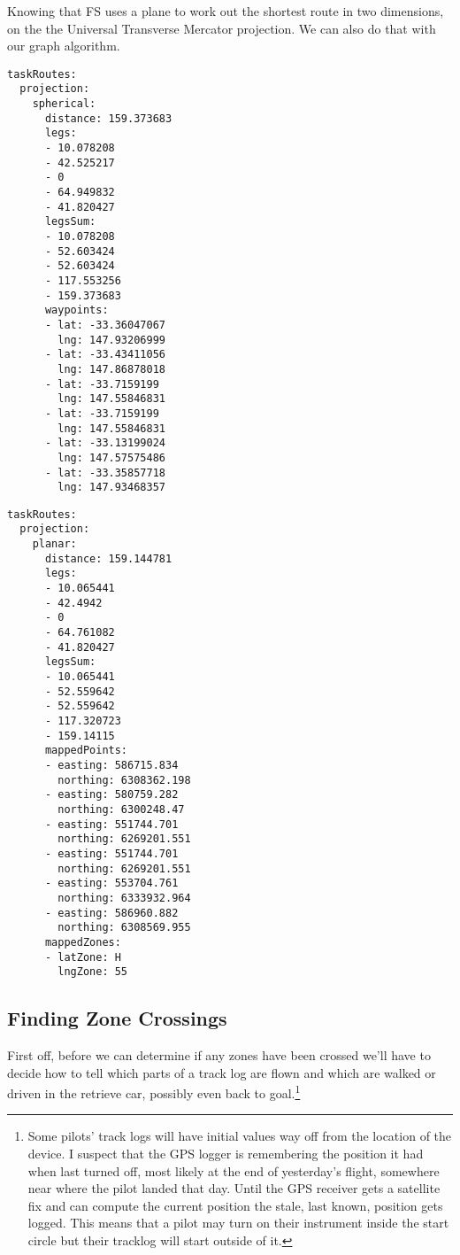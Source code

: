 \documentclass[gap.tex]{subfiles}
\begin{document}
\newpage
Knowing that FS uses a plane to work out the shortest route in two dimensions,
on the the Universal Transverse Mercator projection.  We can also do that with
our graph algorithm.

\begin{lstlisting}[caption={Points on the plane, distances on the sphere, \texttt{projection/spherical} nodes of
\texttt{*.task-length.yaml}.}]
taskRoutes:
  projection:
    spherical:
      distance: 159.373683
      legs:
      - 10.078208
      - 42.525217
      - 0
      - 64.949832
      - 41.820427
      legsSum:
      - 10.078208
      - 52.603424
      - 52.603424
      - 117.553256
      - 159.373683
      waypoints:
      - lat: -33.36047067
        lng: 147.93206999
      - lat: -33.43411056
        lng: 147.86878018
      - lat: -33.7159199
        lng: 147.55846831
      - lat: -33.7159199
        lng: 147.55846831
      - lat: -33.13199024
        lng: 147.57575486
      - lat: -33.35857718
        lng: 147.93468357
\end{lstlisting}
\begin{lstlisting}[caption={Points and distances on the plane, \texttt{projection/planar} nodes of
\texttt{*.task-length.yaml}.}]
taskRoutes:
  projection:
    planar:
      distance: 159.144781
      legs:
      - 10.065441
      - 42.4942
      - 0
      - 64.761082
      - 41.820427
      legsSum:
      - 10.065441
      - 52.559642
      - 52.559642
      - 117.320723
      - 159.14115
      mappedPoints:
      - easting: 586715.834
        northing: 6308362.198
      - easting: 580759.282
        northing: 6300248.47
      - easting: 551744.701
        northing: 6269201.551
      - easting: 551744.701
        northing: 6269201.551
      - easting: 553704.761
        northing: 6333932.964
      - easting: 586960.882
        northing: 6308569.955
      mappedZones:
      - latZone: H
        lngZone: 55
\end{lstlisting}

\newpage
\subsection{Finding Zone Crossings}

First off, before we can determine if any zones have been crossed we'll have to
decide how to tell which parts of a track log are flown and which are walked or
driven in the retrieve car, possibly even back to goal.\footnote{Some pilots'
track logs will have initial values way off from the location of the device.
I suspect that the GPS logger is remembering the position it had when last
turned off, most likely at the end of yesterday's flight, somewhere near where
the pilot landed that day. Until the GPS receiver gets a satellite fix and can
compute the current position the stale, last known, position gets logged. This
means that a pilot may turn on their instrument inside the start circle but
their tracklog will start outside of it.}
\end{document}
